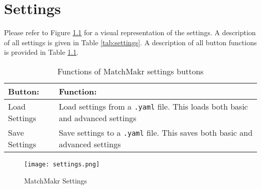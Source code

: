 \chapter{Settings}
\renewcommand{\arraystretch}{1}

Please refer to Figure \ref{fig:settings} for a visual representation of the settings.  A description of all settings is given in Table \ref{tab:settings}.  A description of all button functions is provided in Table \ref{tab:settings_buttons}.

%
%

\newcommand{\buttontable}
	{
		\begin{table}[h!]
			\centering
			\begin{tabular}[t]{| p{2in} | p{2.1in} |}
			
				\hline \textbf{Button:} & \textbf{Function:} \\ \hline \hline
				
				Load Settings & Load settings from a \texttt{.yaml} file.  This loads both basic and advanced settings \\ \hline
				Save Settings & Save settings to a \texttt{.yaml} file.  This saves both basic and advanced settings \\ \hline				
				
				
			\end{tabular}
			\caption{\label{tab:settings_buttons} Functions of MatchMakr settings buttons}
		\end{table}	
	}
	
\buttontable


%
%
\begin{figure}
	\centering
	\texttt{[image: settings.png]}
	\caption{\label{fig:settings} MatchMakr Settings}
\end{figure}

